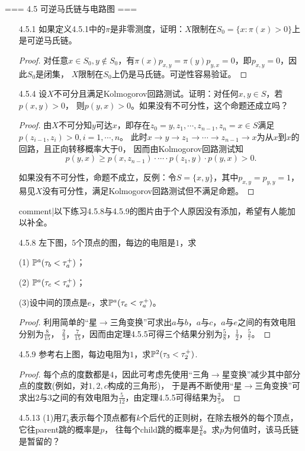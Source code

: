 === 4.5 可逆马氏链与电路图 ===
\begin{enumerate}
    \item[4.5.1] 如果定义4.5.1中的$\pi$是非零测度，证明：$X$限制在$S_0=\{x:\pi(x)>0\}$上是可逆马氏链。
    \begin{proof}
        对任意$x\in S_0,y\notin S_0$，有$\pi(x)p_{x,y}=\pi(y)p_{y,x}=0$，即$p_{x,y}=0$，因此$S_0$是闭集，
        $X$限制在$S_0$上仍是马氏链。可逆性容易验证。
    \end{proof}
    \item[4.5.4] 设$X$不可分且满足Kolmogorov回路测试。证明：对任何$x,y\in S$，若$p(x,y)>0$，
    则$p(y,x)>0$。如果没有不可分性，这个命题还成立吗？
    \begin{proof}
        由$X$不可分知$y$可达$x$，即存在$z_0=y,z_1,\cdots,z_{n-1},z_n=x\in S$满足$p(z_{i-1},z_i)>0,i=1,\cdots,n$。
        此时$x\to y\to z_1\to\cdots\to z_{n-1}\to x$为从$x$到$x$的回路，且正向转移概率大于$0$，
        因而由Kolmogorov回路测试知\[p(y,x)\geqslant p(x,z_{n-1})\cdot\cdots\cdot p(z_1,y)\cdot p(y,x)>0.\]

        如果没有不可分性，命题不成立，反例：令$S=\{x,y\}$，其中$p_{x,y}=p_{y,y}=1$，
        易见$X$没有可分性，满足Kolmogorov回路测试但不满足命题。
    \end{proof}
    {{comment|以下练习4.5.8与4.5.9的图片由于个人原因没有添加，希望有人能加以补全。}}
    \item[4.5.8] 左下图，$5$个顶点的图，每边的电阻是$1$，求

    (1) $\P^a(\tau_b<\tau_a^+)$；

    (2) $\P^a(\tau_c<\tau_a^+)$；

    (3)设中间的顶点是$e$，求$\P^a(\tau_e<\tau_a^+)$。
    \begin{proof}
        利用简单的“星$\to$三角变换”可求出$a$与$b$，$a$与$c$，$a$与$e$之间的有效电阻分别为$\frac{8}{15}$，
        $\frac{2}{3}$，$\frac{7}{15}$，因而由定理4.5.5可得三个结果分别为$\frac{5}{8}$，$\frac{1}{2}$，$\frac{5}{7}$。
    \end{proof}
    \item[4.5.9] 参考右上图，每边电阻为$1$，求$\P^2(\tau_3<\tau_2^+)$.
    \begin{proof}
        每个点的度数都是$4$，因此可考虑先使用“三角$\to$星变换”减少其中部分点的度数(例如，对$1,2,c$构成的三角形)，
        于是再不断使用“星$\to$三角变换”可求出$2$与$3$之间的有效电阻为$\frac{5}{12}$，由定理4.5.5可得结果为$\frac{3}{5}$。
    \end{proof}
    \item[4.5.13] (1)用$T_k$表示每个顶点都有$k$个后代的正则树，在除去根外的每个顶点，它往parent跳的概率是$p$，
    往每个child跳的概率是$\frac{q}{k}$。求$p$为何值时，该马氏链是暂留的？


\end{enumerate}
